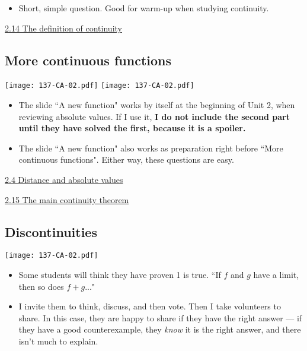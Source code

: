 \documentclass[11pt]{article}
\newcommand{\n}{\newpage}
\newcommand{\nl}{\hfill \vspace{-1.1\baselineskip}} %
\newcommand{\viv}{\hspace{8mm} \href{https://www.youtube.com/watch?v=6wFC38rVMbk&list=PLlwePzQY_wW8P_I8BFgm0-upywEwTKd8_&index=4}{2.4 Distance and absolute values}}
\newcommand{\vxiv}{\hspace{8mm} \href{https://www.youtube.com/watch?v=iF9F1qHTRdM&list=PLlwePzQY_wW8P_I8BFgm0-upywEwTKd8_&index=14}{2.14 The definition of continuity}}
\newcommand{\vxv}{\hspace{8mm} \href{https://www.youtube.com/watch?v=TtdsCGP-MAY&list=PLlwePzQY_wW8P_I8BFgm0-upywEwTKd8_&index=15}{2.15 The main continuity theorem}}
\begin{document}
\begin{comments}
\nl
	\begin{itemize}
		\item Short, simple question.  Good for warm-up when studying continuity.
	\end{itemize}
\end{comments}

\begin{videos}
\vxiv
\end{videos}

\n
\newpage
\subsection{More continuous functions} 

\begin{center}
{ \texttt{[image: 137-CA-02.pdf]}}
\quad
{ \texttt{[image: 137-CA-02.pdf]}}
\end{center}

\begin{comments}
\nl
	\begin{itemize}
		\item  The slide ``A new function" works by itself at the beginning of Unit 2, when reviewing absolute values.  If I use it, \textbf{I do not include the second part until they have solved the first, because it is a spoiler. }
  		
		\item The slide ``A new function" also works as preparation right before ``More continuous functions".    Either way, these questions are easy.
	\end{itemize}
\end{comments}

\begin{videos}
\viv

\vxv
\end{videos}

\n
\newpage
\subsection{Discontinuities} 

\begin{center}
{ \texttt{[image: 137-CA-02.pdf]}}
\end{center}

\begin{comments}
\nl
	\begin{itemize}
		\item   Some students will think they have proven 1 is true.  ``If $f$ and $g$ have a limit, then so does $f+g$..."
		\item I invite them to think, discuss, and then vote.  Then I take volunteers to share. In this case, they are happy to share if they have the right answer --- if they have a good counterexample, they \emph{know} it is the right answer, and there isn't much to explain.
	\end{itemize}
\end{comments}
\end{document}
